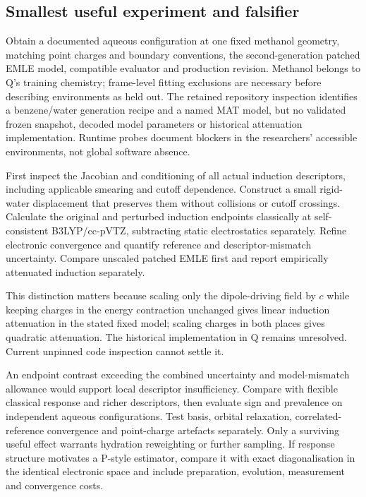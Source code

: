 \documentclass{article}
\begin{document}
\subsection{Smallest useful experiment and falsifier}

Obtain a documented aqueous configuration at one fixed methanol geometry, matching point charges and boundary conventions, the second-generation patched EMLE model, compatible evaluator and production revision. Methanol belongs to Q's training chemistry; frame-level fitting exclusions are necessary before describing environments as held out. The retained repository inspection identifies a benzene/water generation recipe and a named MAT model, but no validated frozen snapshot, decoded model parameters or historical attenuation implementation. Runtime probes document blockers in the researchers' accessible environments, not global software absence.

First inspect the Jacobian and conditioning of all actual induction descriptors, including applicable smearing and cutoff dependence. Construct a small rigid-water displacement that preserves them without collisions or cutoff crossings. Calculate the original and perturbed induction endpoints classically at self-consistent B3LYP/cc-pVTZ, subtracting static electrostatics separately. Refine electronic convergence and quantify reference and descriptor-mismatch uncertainty. Compare unscaled patched EMLE first and report empirically attenuated induction separately.

This distinction matters because scaling only the dipole-driving field by $c$ while keeping charges in the energy contraction unchanged gives linear induction attenuation in the stated fixed model; scaling charges in both places gives quadratic attenuation. The historical implementation in Q remains unresolved. Current unpinned code inspection cannot settle it.

An endpoint contrast exceeding the combined uncertainty and model-mismatch allowance would support local descriptor insufficiency. Compare with flexible classical response and richer descriptors, then evaluate sign and prevalence on independent aqueous configurations. Test basis, orbital relaxation, correlated-reference convergence and point-charge artefacts separately. Only a surviving useful effect warrants hydration reweighting or further sampling. If response structure motivates a P-style estimator, compare it with exact diagonalisation in the identical electronic space and include preparation, evolution, measurement and convergence costs.
\end{document}
